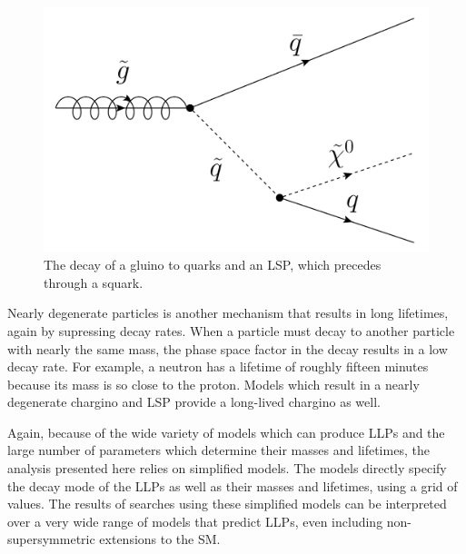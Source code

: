 \begin{figure}
\includegraphics[width=\fullfig]{figures/gluino_decay.png}
\caption{The decay of a gluino to quarks and an \ac{LSP}, which precedes through a squark.}
\label{fig:gluino_decay}
\end{figure}

Nearly degenerate particles is another mechanism that results in long lifetimes, again by supressing decay rates.
When a particle must decay to another particle with nearly the same mass, the phase space factor in the decay results in a low decay rate.
For example, a neutron has a lifetime of roughly fifteen minutes because its mass is so close to the proton.
Models which result in a nearly degenerate chargino and \ac{LSP} provide a long-lived chargino as well.

Again, because of the wide variety of models which can produce \acp{LLP} and the large number of parameters which determine their masses and lifetimes, the analysis presented here relies on simplified models.
The models directly specify the decay mode of the \acp{LLP}  as well as their masses and lifetimes, using a grid of values.
The results of searches using these simplified models can be interpreted over a very wide range of models that predict \acp{LLP}, even including non-supersymmetric extensions to the \ac{SM}.

